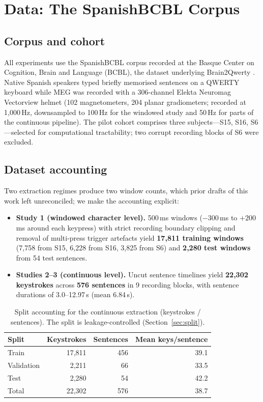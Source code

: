 \documentclass[11pt,a4paper]{report}
\begin{document}
\chapter{Data: The SpanishBCBL Corpus}
\label{ch:data}

\section{Corpus and cohort}
All experiments use the SpanishBCBL corpus recorded at the Basque Center on
Cognition, Brain and Language (BCBL), the dataset underlying Brain2Qwerty
\citep{levy2025brain2qwerty}. Native Spanish speakers typed briefly memorised
sentences on a QWERTY keyboard while MEG was recorded with a 306-channel
Elekta Neuromag Vectorview helmet (102 magnetometers, 204 planar
gradiometers; recorded at 1{,}000\,Hz, downsampled to 100\,Hz for the
windowed study and 50\,Hz for parts of the continuous pipeline). The pilot
cohort comprises three subjects---S15, S16, S6---selected for computational
tractability; two corrupt recording blocks of S6 were excluded.

\section{Dataset accounting}
\label{sec:accounting}
Two extraction regimes produce two window counts, which prior drafts of this
work left unreconciled; we make the accounting explicit:

\begin{itemize}
  \item \textbf{Study 1 (windowed character level).} 500\,ms windows
  ($-300$\,ms to $+200$\,ms around each keypress) with strict recording
  boundary clipping and removal of multi-press trigger artefacts yield
  \textbf{17{,}811 training windows} (7{,}758 from S15, 6{,}228 from S16,
  3{,}825 from S6) and \textbf{2{,}280 test windows} from 54 test sentences.
  \item \textbf{Studies 2--3 (continuous level).} Uncut sentence timelines
  yield \textbf{22{,}302 keystrokes} across \textbf{576 sentences} in 9
  recording blocks, with sentence durations of 3.0--12.97\,s (mean 6.84\,s).
\end{itemize}

\begin{table}[htbp]
\centering
\caption{Split accounting for the continuous extraction (keystrokes /
sentences). The split is leakage-controlled (Section~\ref{sec:split}).}
\label{tab:splits}
\begin{tabular}{lrrr}
\toprule
Split & Keystrokes & Sentences & Mean keys/sentence \\
\midrule
Train & 17{,}811 & 456 & 39.1 \\
Validation & 2{,}211 & 66 & 33.5 \\
Test & 2{,}280 & 54 & 42.2 \\
\midrule
Total & 22{,}302 & 576 & 38.7 \\
\bottomrule
\end{tabular}
\end{table}
\end{document}
